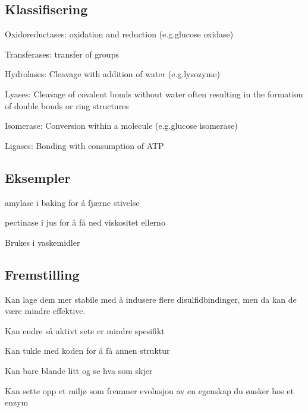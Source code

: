 \subsection{Klassifisering}
    Oxidoreductases: oxidation and reduction (e.g.glucose oxidase)

    Transferases: transfer of groups
    
    Hydrolases: Cleavage with addition of water (e.g.lysozyme)
    
    Lyases: Cleavage of covalent bonds without water often resulting in the formation of double bonds or ring structures
    
    Isomerase: Conversion within a molecule (e.g.glucose isomerase) 
    
    Ligases: Bonding with consumption of ATP

\subsection{Eksempler}
    amylase i baking for å fjærne stivelse

    pectinase i jus for å få ned viskositet ellerno

    Brukes i vaskemidler


\subsection{Fremstilling}

    Kan lage dem mer stabile med å indusere flere disulfidbindinger, men da kan de være mindre effektive. 

    Kan endre så aktivt sete er mindre spesifikt

    Kan tukle med koden for å få annen struktur

    Kan bare blande litt og se hva som skjer

    Kan sette opp et miljø som fremmer evolusjon av en egenskap du ønsker hos et enzym
    